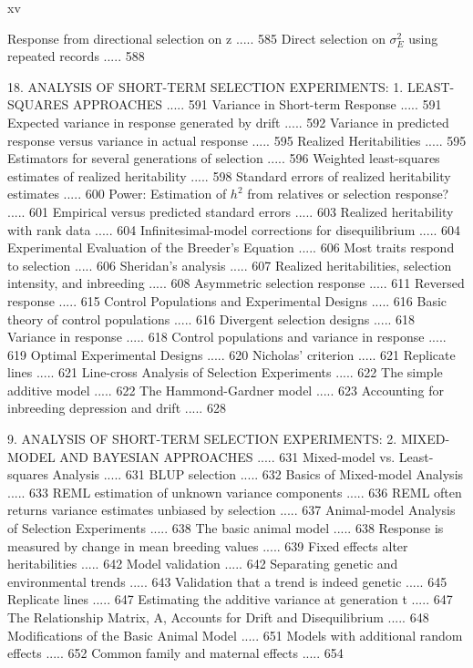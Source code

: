 \documentclass{article}
\begin{document}
xv

Response from directional selection on z ..... 585
Direct selection on  $ \sigma_{E}^{2} $ using repeated records ..... 588

18. ANALYSIS OF SHORT-TERM SELECTION EXPERIMENTS:
1. LEAST-SQUARES APPROACHES ..... 591
Variance in Short-term Response ..... 591
Expected variance in response generated by drift ..... 592
Variance in predicted response versus variance in actual response ..... 595
Realized Heritabilities ..... 595
Estimators for several generations of selection ..... 596
Weighted least-squares estimates of realized heritability ..... 598
Standard errors of realized heritability estimates ..... 600
Power: Estimation of  $ h^{2} $ from relatives or selection response? ..... 601
Empirical versus predicted standard errors ..... 603
Realized heritability with rank data ..... 604
Infinitesimal-model corrections for disequilibrium ..... 604
Experimental Evaluation of the Breeder's Equation ..... 606
Most traits respond to selection ..... 606
Sheridan's analysis ..... 607
Realized heritabilities, selection intensity, and inbreeding ..... 608
Asymmetric selection response ..... 611
Reversed response ..... 615
Control Populations and Experimental Designs ..... 616
Basic theory of control populations ..... 616
Divergent selection designs ..... 618
Variance in response ..... 618
Control populations and variance in response ..... 619
Optimal Experimental Designs ..... 620
Nicholas' criterion ..... 621
Replicate lines ..... 621
Line-cross Analysis of Selection Experiments ..... 622
The simple additive model ..... 622
The Hammond-Gardner model ..... 623
Accounting for inbreeding depression and drift ..... 628

9. ANALYSIS OF SHORT-TERM SELECTION EXPERIMENTS:
2. MIXED-MODEL AND BAYESIAN APPROACHES ..... 631
Mixed-model vs. Least-squares Analysis ..... 631
BLUP selection ..... 632
Basics of Mixed-model Analysis ..... 633
REML estimation of unknown variance components ..... 636
REML often returns variance estimates unbiased by selection ..... 637
Animal-model Analysis of Selection Experiments ..... 638
The basic animal model ..... 638
Response is measured by change in mean breeding values ..... 639
Fixed effects alter heritabilities ..... 642
Model validation ..... 642
Separating genetic and environmental trends ..... 643
Validation that a trend is indeed genetic ..... 645
Replicate lines ..... 647
Estimating the additive variance at generation t ..... 647
The Relationship Matrix, A, Accounts for Drift and Disequilibrium ..... 648
Modifications of the Basic Animal Model ..... 651
Models with additional random effects ..... 652
Common family and maternal effects ..... 654
\end{document}

